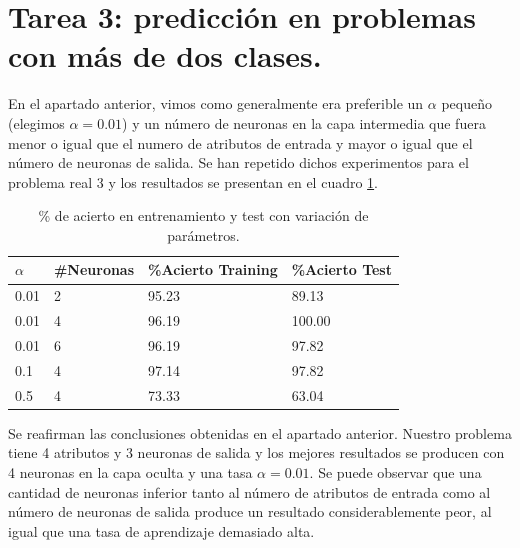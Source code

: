 \documentclass[spanish]{assignment}
\begin{document}
	\section{Tarea 3: predicción en problemas con más de dos clases.}
	
	En el apartado anterior, vimos como generalmente era preferible un $\alpha$ pequeño (elegimos $\alpha = 0.01$) y un número de neuronas en la capa intermedia que fuera menor o igual que el numero de atributos de entrada y mayor o igual que el número de neuronas de salida. Se han repetido dichos experimentos para el problema real 3 y los resultados se presentan en el cuadro \ref{tab:pr3chart}.	
	\begin{table}[ht!]
		\centering
		\begin{tabular}{|l|l|l|l|}
			\hline
			\textbf{$\alpha$} & \textbf{\#Neuronas} & \textbf{ \%Acierto Training} & \textbf{\%Acierto Test} \\ \hline
			0.01& 2 & 95.23 & 89.13 \\ \hline
			0.01& 4 & 96.19 & 100.00 \\ \hline
			0.01& 6 & 96.19 & 97.82 \\ \hline
			0.1& 4 & 97.14 & 97.82 \\ \hline
			0.5& 4 & 73.33 & 63.04 \\ \hline
		\end{tabular}
		\caption{\% de acierto en entrenamiento y test con variación de parámetros.}
		\label{tab:pr3chart}
	\end{table}
	
	Se reafirman las conclusiones obtenidas en el apartado anterior. Nuestro problema tiene 4 atributos y 3 neuronas de salida y los mejores resultados se producen con 4 neuronas en la capa oculta y una tasa $\alpha=0.01$. Se puede observar que una cantidad de neuronas inferior tanto al número de atributos de entrada como al número de neuronas de salida produce un resultado considerablemente peor, al igual que una tasa de aprendizaje demasiado alta.
	
\end{document}
